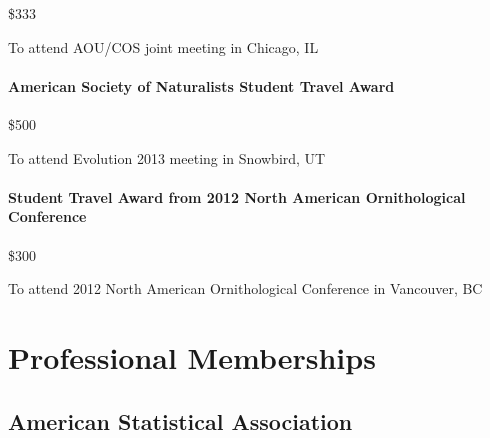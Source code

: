 \documentclass[
  letterpaper,
  DIV=11,
  numbers=noendperiod,
  oneside]{scrreprt}
\begin{document}
\$333


To attend AOU/COS joint meeting in Chicago, IL

\subsubsection{American Society of Naturalists Student Travel
Award}\label{american-society-of-naturalists-student-travel-award}

\$500


To attend Evolution 2013 meeting in Snowbird, UT

\subsubsection{Student Travel Award from 2012 North American
Ornithological
Conference}\label{student-travel-award-from-2012-north-american-ornithological-conference}

\$300


To attend 2012 North American Ornithological Conference in Vancouver, BC


\chapter{Professional Memberships}\label{professional-memberships}

\section{American Statistical
Association}\label{american-statistical-association}

\end{document}
